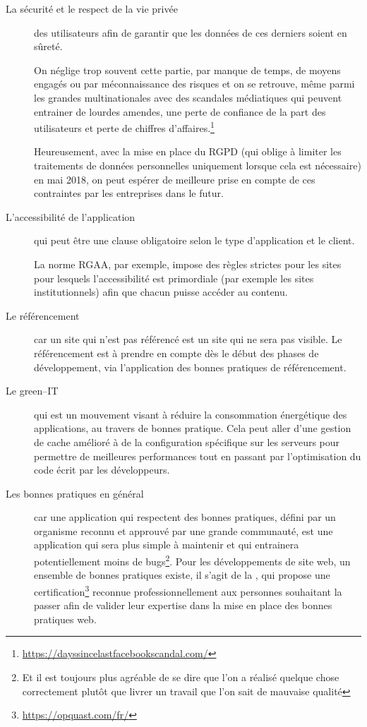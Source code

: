 \begin{description}
	\item [La sécurité et le respect de la vie privée] des utilisateurs afin de garantir que les données de ces derniers soient en sûreté. 
	
	On néglige trop souvent cette partie, par manque de temps, de moyens engagés ou par méconnaissance des risques et on se retrouve, même parmi les grandes multinationales avec des scandales médiatiques qui peuvent entrainer de lourdes amendes, une perte de confiance de la part des utilisateurs et perte de chiffres d'affaires.\footnote{\url{https://dayssincelastfacebookscandal.com/}}
	
	Heureusement, avec la mise en place du \gls{RGPD} (qui oblige à limiter les traitements de données personnelles uniquement lorsque cela est nécessaire) en mai 2018, on peut espérer de meilleure prise en compte de ces contraintes par les entreprises dans le futur.
	\item [L'accessibilité de l'application] qui peut être une clause obligatoire selon le type d'application et le client.
	
	La norme \gls{RGAA}, par exemple, impose des règles strictes pour les sites pour lesquels l'accessibilité est primordiale (par exemple les sites institutionnels) afin que chacun puisse accéder au contenu.
	\item [Le référencement] car un site qui n'est pas référencé est un site qui ne sera pas visible. Le référencement est à prendre en compte dès le début des phases de développement, via l'application des bonnes pratiques de référencement.
	\item [Le green--IT] qui est un mouvement visant à réduire la consommation énergétique des applications, au travers de bonnes pratique. Cela peut aller d'une gestion de cache amélioré à de la configuration spécifique sur les serveurs pour permettre de meilleures performances tout en passant par l'optimisation du code écrit par les développeurs.
	\item [Les bonnes pratiques en général] car une application qui respectent des bonnes pratiques, défini par un organisme reconnu et approuvé par une grande communauté, est une application qui sera plus simple à maintenir et qui entrainera potentiellement moins de bugs\footnote{Et il est toujours plus agréable de se dire que l'on a réalisé quelque chose correctement plutôt que livrer un travail que l'on sait de mauvaise qualité}. Pour les développements de site web, un ensemble de bonnes pratiques existe, il s'agit de la  \cite{opquast-best-practices}, qui propose une certification\footnote{\url{https://opquast.com/fr/}} reconnue professionnellement aux personnes souhaitant la passer afin de valider leur expertise dans la mise en place des bonnes pratiques web.
\end{description}


